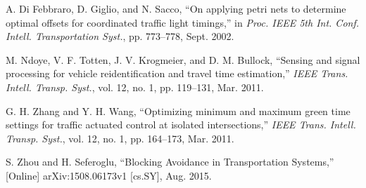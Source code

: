 \documentclass[conference]{IEEEtran}
\begin{document}
\begin{thebibliography}{}
 A. Di Febbraro, D. Giglio, and N. Sacco, ``On applying petri nets
to determine optimal offsets for coordinated traffic light timings,'' in {\em Proc. IEEE 5th Int. Conf. Intell. Transportation Syst.}, pp. 773--778, Sept. 2002.

 M. Ndoye, V. F. Totten, J. V. Krogmeier, and D. M. Bullock, ``Sensing and signal processing for vehicle reidentification and travel time estimation,'' {\em IEEE Trans. Intell. Transp. Syst.}, vol. 12, no. 1, pp. 119--131, Mar. 2011.

 G. H. Zhang and Y. H. Wang, ``Optimizing minimum and maximum green time settings for traffic actuated control at isolated intersections,'' {\em IEEE Trans. Intell. Transp. Syst.}, vol. 12, no. 1, pp. 164--173, Mar. 2011.

 S. Zhou and H. Seferoglu, ``Blocking Avoidance in Transportation Systems,'' [Online] arXiv:1508.06173v1 [cs.SY], Aug. 2015.  


\end{thebibliography} 
\end{document}
